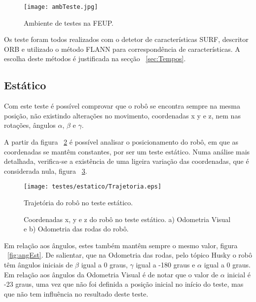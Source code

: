 \begin{figure}[h!] 
	\begin{center}
		\leavevmode		
		\texttt{[image: ambTeste.jpg]}
		\caption{Ambiente de testes na FEUP.}
		\label{fig:ambTeste}
	\end{center}
\end{figure}


Os teste foram todos realizados com o detetor de características SURF, descritor ORB e utilizado o método FLANN para correspondência de características. A escolha deste métodos é justificada na secção ~\ref{sec:Tempos}.


\subsection{Estático}\label{subsubsection:Estatico}

Com este teste é possível comprovar que o robô se encontra sempre na mesma posição, não existindo alterações no movimento, coordenadas x y e z, nem nas rotações, ângulos $\alpha$, $\beta$ e $\gamma$.



A partir da figura ~\ref{fig:trajRoboEst}  é possível analisar o posicionamento do robô, em que as coordenadas se  mantêm constantes, por ser um teste estático. Numa análise mais detalhada, verifica-se a existência de uma ligeira variação das coordenadas, que é considerada nula, figura ~\ref{fig:posEst}.


\begin{figure}[!htbp]
	\begin{center}
		\leavevmode		
		\texttt{[image: testes/estatico/Trajetoria.eps]}
		\caption{Trajetória do robô no teste estático.}
		\label{fig:trajRoboEst}
	\end{center}
\end{figure}



\begin{figure}[!htbp]
	\centering
	\qquad
	\caption{Coordenadas x, y e z do robô no teste estático. a) Odometria Visual e b) Odometria das rodas do robô.}
	\label{fig:posEst}
\end{figure}

Em relação aos ângulos, estes também mantêm sempre o mesmo valor, figura ~\ref{fig:angEst}. De salientar, que na Odometria das rodas, pelo tópico Husky o robô têm ângulos iniciais de  $\beta$ igual a 0 graus, $\gamma$ igual a -180 graus e $\alpha$ igual a 0 graus. Em relação aos ângulos da Odometria Visual é de notar que o valor de  $\alpha$ inicial é -23 graus, uma vez que não foi definida a posição inicial no início do teste, mas que não tem influência no resultado deste teste.

